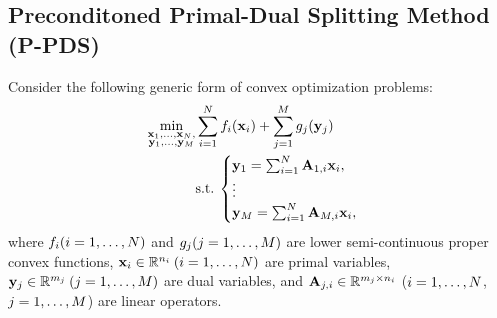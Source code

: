 \documentclass[10pt,journal]{IEEEtran}
\begin{document}
\subsection{Preconditoned Primal-Dual Splitting Method (P-PDS)}
\label{subsec:P-PDS}
Consider the following generic form of convex optimization problems:
\begin{align}
    \label{prob:convex_optim_prob}
    \min_{\substack{\mathbf{x}_{1}, \ldots, \mathbf{x}_{N}, \\ 
        \mathbf{y}_{1}, \ldots, \mathbf{y}_{M}}} 
        & \sum_{i=1}^{N} f_{i} (\mathbf{x}_{i}) + \sum_{j=1}^{M} g_{j} (\mathbf{y}_{j}) \nonumber \\ 
        & \mathrm{s.t.} \:
        \begin{cases} 
            \mathbf{y}_{1} = \sum_{i=1}^{N} \mathbf{A}_{1,i} \mathbf{x}_{i}, \\ 
            \vdots \\ 
            \mathbf{y}_{M} = \sum_{i=1}^{N} \mathbf{A}_{M,i} \mathbf{x}_{i}, 
        \end{cases}
\end{align}
where $f_{i} (i = 1, \ldots, N)$ and $g_{j} (j = 1, \ldots, M)$ are lower semi-continuous proper convex functions, $\mathbf{x}_{i} \in \mathbb{R}^{n_{i}} \: (i = 1, \dots, N)$ are primal variables, $\mathbf{y}_{j} \in \mathbb{R}^{m_{j}} \: (j = 1, \dots, M)$ are dual variables, and $\mathbf{A}_{j,i} \in \mathbb{R}^{m_{j} \times  n_{i}}$ ($i = 1, \ldots, N$, $j = 1, \ldots, M$) are linear operators.
\end{document}

